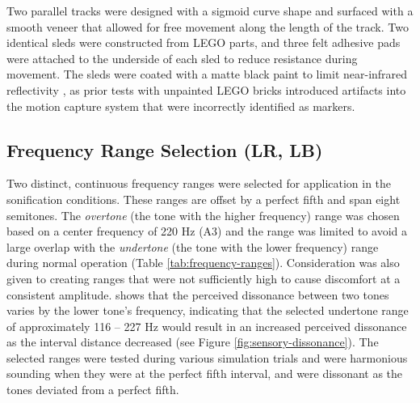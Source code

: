 \documentclass[10pt,a4paper,onecolumn]{article}
\begin{document}
Two parallel tracks were designed with a sigmoid curve shape and surfaced with a smooth veneer that allowed for free movement along the length of the track. Two identical sleds were constructed from LEGO parts, and three felt adhesive pads were attached to the underside of each sled to reduce resistance during movement. The sleds were coated with a matte black paint to limit near-infrared reflectivity \autocite{benedictSurveyMaterialsCoatings2016}, as prior tests with unpainted LEGO bricks introduced artifacts into the motion capture system that were incorrectly identified as markers.

\hypertarget{frequency-range-selection-lr-lb}{%
\subsection{Frequency Range Selection (LR, LB)}\label{frequency-range-selection-lr-lb}}

Two distinct, continuous frequency ranges were selected for application in the sonification conditions. These ranges are offset by a perfect fifth and span eight semitones. The \emph{overtone} (the tone with the higher frequency) range was chosen based on a center frequency of 220 Hz (A3) and the range was limited to avoid a large overlap with the \emph{undertone} (the tone with the lower frequency) range during normal operation (Table \ref{tab:frequency-ranges}). Consideration was also given to creating ranges that were not sufficiently high to cause discomfort at a consistent amplitude. \textcite{setharesSoundSound2005} shows that the perceived dissonance between two tones varies by the lower tone's frequency, indicating that the selected undertone range of approximately 116 -- 227 Hz would result in an increased perceived dissonance as the interval distance decreased (see Figure \ref{fig:sensory-dissonance}). The selected ranges were tested during various simulation trials and were harmonious sounding when they were at the perfect fifth interval, and were dissonant as the tones deviated from a perfect fifth.
\end{document}
